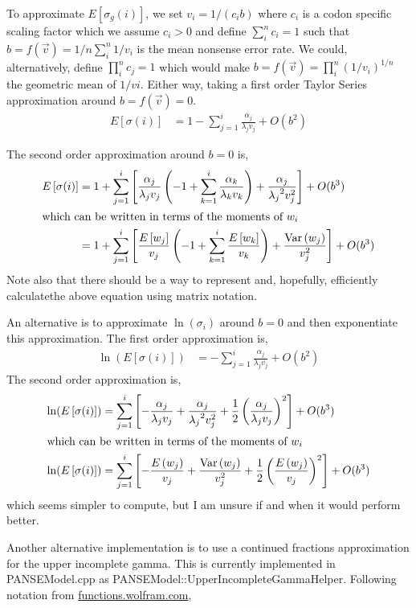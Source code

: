 \documentclass{article}
\newcommand{\elongWaitTime}{\ensuremath{w}\xspace}
\newcommand{\wi}{\ensuremath{\elongWaitTime_i}\xspace}
\newcommand{\wj}{\ensuremath{\elongWaitTime_j}\xspace}
\newcommand{\wk}{\ensuremath{\elongWaitTime_k}\xspace}
\newcommand{\alphaj}{\ensuremath{{\alpha_j}}\xspace}
\newcommand{\alphak}{\ensuremath{{\alpha_k}}\xspace}
\newcommand{\lambdaj}{\ensuremath{{\lambda_j}}\xspace}
\newcommand{\lambdak}{\ensuremath{{\lambda_k}}\xspace}
\newcommand{\nseWaitTime}{\ensuremath{v}\xspace}
\newcommand{\vi}{\ensuremath{\nseWaitTime_{i}}\xspace}
\newcommand{\vj}{\ensuremath{\nseWaitTime_{j}}\xspace}
\newcommand{\vk}{\ensuremath{\nseWaitTime_{k}}\xspace}
\newcommand{\Esigmagi}{\ensuremath{E\left[\sigma_{g}(i)\right]}\xspace}
\newcommand{\Esigmai}{\ensuremath{E\left[\sigma(i)\right]}\xspace}
\newcommand{\Var}{\ensuremath{\text{Var}}\xspace}
\begin{document}
To approximate \Esigmagi, we set $\vi = 1/(c_i b)$ where $c_i$ is a codon specific scaling factor which we assume $c_i>0$ and define $\sum_i^n c_i = 1$ such that $b = f(\vec{v})=  1/n \sum_i^n 1/\vi$ is the mean nonsense error rate.
We could, alternatively, define $\prod_i^n c_j = 1$ which would make $b = f(\vec{v}) =  \prod_i^n (1/\vi)^{1/n}$ the geometric mean of $1/vi$.
Either way, taking a first order Taylor Series approximation around $b= f(\vec{v}) =0$.
\begin{align}
\label{eq:approxESigmag}
  \Esigmai &= 1 - \sum_{j=1}^i \frac{\alphaj}{\lambdaj \vj}+ O(b^2)
\end{align}

The second order approximation around $b=0$ is,
\begin{align}
\label{eq:secondOrderApproxESigmag}
  \Esigmai &= 1 + \sum_{j=1}^i \left[\frac{\alphaj}{\lambdaj \vj} \left(-1+\sum_{k=1}^i\frac{\alphak}{\lambdak \vk} \right)+\frac{\alphaj}{\lambdaj^2 \vj^2}\right] +  O(b^3)\\
\intertext{which can be written in terms of the moments of \wi}
&= 1 + \sum_{j=1}^i \left[\frac{E\left[\wj\right]}{\vj} \left(-1+\sum_{k=1}^i\frac{E\left[\wk\right]}{ \vk} \right)+\frac{\Var\left(\wj\right)}{\vj^2}\right] +  O(b^3)
\end{align}
Note also that there should be a way to represent and, hopefully, efficiently calculatethe above equation using matrix notation.

An alternative is to approximate $\ln(\sigma_i)$ around $b=0$ and then exponentiate this approximation.
The first order approximation is,
\begin{align}
\ln(\Esigmai) &= - \sum_{j=1}^i \frac{\alphaj}{\lambdaj \vj} + O(b^2)
\end{align}
The second order approximation is,
\begin{align}
\ln(\Esigmai) &= \sum_{j=1}^i \left[-\frac{\alphaj}{\lambdaj \vj} + \frac{\alphaj}{\lambdaj^2 \vj^2} + \frac{1}{2} \left(\frac{\alphaj}{\lambdaj \vj}\right)^2\right]+ O(b^3)\\
\intertext{which can be written in terms of the moments of \wi}
\ln(\Esigmai) &= \sum_{j=1}^i \left[-\frac{E\left(\wj\right)}{\vj} + \frac{\Var\left(\wj\right)}{ \vj^2} + \frac{1}{2} \left(\frac{E\left(\wj\right)}{\vj}\right)^2\right]+ O(b^3)
\end{align}
which seems simpler to compute, but I am unsure if and when it would perform better.

Another alternative implementation is to use a continued fractions approximation for the upper incomplete gamma.
This is currently implemented in PANSEModel.cpp as PANSEModel::UpperIncompleteGammaHelper.
Following notation from \href{http://functions.wolfram.com/GammaBetaErf/Gamma2/10/}{functions.wolfram.com},
\end{document}
